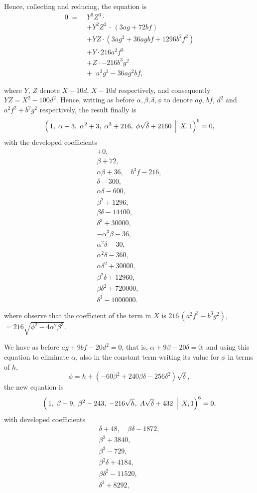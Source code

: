 \documentclass[11pt]{article}
\begin{document}
\medskip
Hence, collecting and reducing, the equation is
\begin{align*}
0\;=\;& Y^{3}Z^{3}\cdot\\
& +Y^{2}Z^{2}\,\cdot\,(3ag+72bf)\\
& +YZ\cdot(3ag^{2}+36agbf+1296b^{2}f^{2})\\
& +Y\cdot 216a^{2}f^{3}\\
& +Z\cdot-216b^{3}g^{2}\\
& +\;\;a^{3}g^{3}-36ag^{2}bf,
\end{align*}

\newpage
\noindent
where $Y$, $Z$ denote $X+10d$, $X-10d$ respectively, and
consequently $YZ=X^{2}-100d^{2}$.  Hence, writing as before
$\alpha,\beta,\delta,\phi$ to denote $ag$, $bf$, $d^{2}$ and
$a^{2}f^{2}+b^{2}g^{2}$ respectively, the result finally is
\[
\Bigl(\,1,\;\alpha+3,\;\alpha^{2}+3,\;\alpha^{3}+216,\;\phi\sqrt{\delta}+2160\,\Bigm|\,X,1\Bigr)^{6}=0,
\]
with the developed coefficients
\[
\begin{array}{c}
+0,\\
\beta+72,\\
\alpha\beta+36,\quad b^{3}f-216,\\
\delta-300,\\
\alpha\delta-600,\\
\beta^{2}+1296,\\
\beta\delta-14400,\\
\delta^{3}+30000,\\
-\alpha^{3}\beta-36,\\
\alpha^{2}\delta-30,\\
\alpha^{2}\delta-360,\\
\alpha\delta^{2}+30000,\\
\beta^{2}\delta+12960,\\
\beta\delta^{2}+720000,\\
\delta^{3}-1000000.
\end{array}
\]

\medskip
\noindent
where observe that the coefficient of the term in $X$ is
$216\,(a^{2}f^{3}-b^{3}g^{2})$, $=216\sqrt{\phi^{2}-4\alpha^{2}\beta^{3}}$.

\medskip
We have as before $ag+9bf-20d^{2}=0$, that is,
$\alpha+9\beta-20\delta=0$; and using this equation to eliminate
$\alpha$, also in the constant term writing its value for $\phi$ in
terms of $h$,
\[
  \phi=h+(-60\beta^{2}+240\beta\delta-256\delta^{2})\sqrt{\delta},
\]
the new equation is
\[
\Bigl(\,1,\;\beta-9,\;\beta^{2}-243,\;-216\sqrt{h},\;A\sqrt{\delta}+432\,\Bigm|\,X,1\Bigr)^{6}=0,
\]
with developed coefficients
\[
\begin{array}{l}
\delta+48,\quad \beta\delta-1872,\\
\beta^{2}+3840,\\
\beta^{3}-729,\\
\beta^{2}\delta+4184,\\
\beta\delta^{2}-11520,\\
\delta^{3}+8292,
\end{array}
\]
\end{document}
